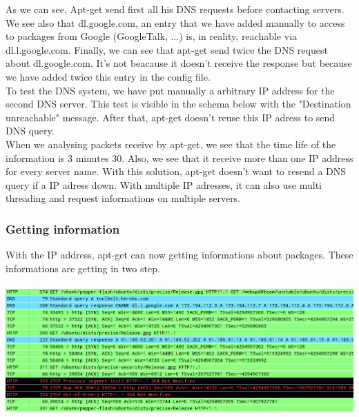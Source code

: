 \documentclass[twoside]{article}
\begin{document}
\begin{multicols}{2}
As we can see, Apt-get send first all his DNS requests before contacting servers.  We see also that dl.google.com, an entry that we have added manually to access to packages from Google (GoogleTalk, ...) is, in reality, reachable via dl.l.google.com.  Finally, we can see that apt-get send twice the DNS request about dl.google.com.  It's not beacause it doesn't receive the response but because we have added twice this entry in the config file.\\
To test the DNS system, we have put manually a arbitrary IP address for the second DNS server.  This test is visible in the schema below with the "Destination unreachable" message.  After that, apt-get doesn't reuse this IP adress to send DNS query.\\
When we analysing packets receive by apt-get, we see that the time life of the information is 3 minutes 30.  Also, we see that it receive more than one IP address for every server name.  With this solution, apt-get doesn't want  to resend a DNS query if a IP adress down.  With multiple IP adresses, it can also  use multi threading and request informations on multiple servers.\\
\subsubsection{Getting information}
With the IP address, apt-get can now getting informations about packages.  These informations are getting in two step.\\ \\ \includegraphics[scale=0.2]{pictures/update_get_1.png}






\printbibliography


\end{multicols}
\end{document}
